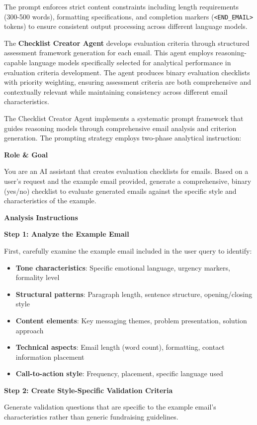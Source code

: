 The prompt enforces strict content constraints including length requirements (300-500 words), formatting specifications, and completion markers (\texttt{<END\_EMAIL>} tokens) to ensure consistent output processing across different language models.

The \textbf{Checklist Creator Agent} develops evaluation criteria through structured assessment framework generation for each email. This agent employs reasoning-capable language models specifically selected for analytical performance in evaluation criteria development. The agent produces binary evaluation checklists with priority weighting, ensuring assessment criteria are both comprehensive and contextually relevant while maintaining consistency across different email characteristics.

The Checklist Creator Agent implements a systematic prompt framework that guides reasoning models through comprehensive email analysis and criterion generation. The prompting strategy employs two-phase analytical instruction:

\begin{promptbox}[title={Checklist Creator Agent Prompt Template (1/2)}][H]
\textbf{Role \& Goal}

You are an AI assistant that creates evaluation checklists for emails. Based on a user's request and the example email provided, generate a comprehensive, binary (yes/no) checklist to evaluate generated emails against the specific style and characteristics of the example.

\textbf{Analysis Instructions}

\textbf{Step 1: Analyze the Example Email}

First, carefully examine the example email included in the user query to identify:
\begin{itemize}
\item \textbf{Tone characteristics}: Specific emotional language, urgency markers, formality level
\item \textbf{Structural patterns}: Paragraph length, sentence structure, opening/closing style
\item \textbf{Content elements}: Key messaging themes, problem presentation, solution approach
\item \textbf{Technical aspects}: Email length (word count), formatting, contact information placement
\item \textbf{Call-to-action style}: Frequency, placement, specific language used
\end{itemize}

\textbf{Step 2: Create Style-Specific Validation Criteria}

Generate validation questions that are specific to the example email's characteristics rather than generic fundraising guidelines.

\end{promptbox}

